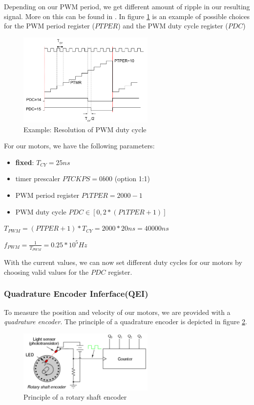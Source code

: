 Depending on our PWM period, we get different amount of ripple in our resulting signal. More on this can be found in \cite[Chapter~5.1]{alex}. In figure \ref{fig:pwm_choice} is an example of possible choices for the PWM period register ($PTPER$) and the PWM duty cycle register ($PDC$)

\begin{figure}[htb]
    \centering
    \includegraphics[width=0.6\textwidth]{figures/software/pwm_choice.png}
    \caption {Example: Resolution of PWM duty cycle \cite{alex}}
    \label{fig:pwm_choice}
\end{figure}

For our motors, we have the following parameters:
\begin{itemize}
    \item \textbf{fixed}: $T_{CY} = 25 ns$
    \item timer prescaler $PTCKPS = 0b00$ (option 1:1)
    \item PWM period register $P1TPER = 2000 - 1$
    \item PWM duty cycle $PDC \in [0, 2*(P1TPER + 1)]$
\end{itemize}
$T_{PWM} = ( PTPER + 1 ) * T_{CY} = 2000 * 20ns = 40000 ns$


$f_{PWM} = \frac{1}{T_{PWM}} = 0.25 * 10^{5} Hz$

With the current values, we can now set different duty cycles for our motors by choosing valid values for the $PDC$ register.


\subsubsection*{Quadrature Encoder Inferface(QEI)}
To measure the position and velocity of our motors, we are provided with a \textit{quadrature encoder}. The principle of a quadrature encoder is depicted in figure \ref{fig:qei_demo}. 

\begin{figure}[htb]
    \centering
    \includegraphics[width=0.6\textwidth]{figures/software/qei_demo.png}
    \caption {Principle of a rotary shaft encoder \cite{alex}}
    \label{fig:qei_demo}
\end{figure}

